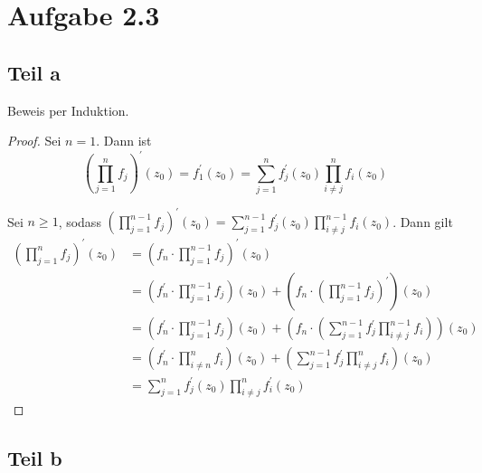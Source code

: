\documentclass[10pt,a4paper]{article}
\begin{document}
\section{Aufgabe 2.3}

\subsection{Teil a}

Beweis per Induktion.

\begin{proof}
  Sei $n = 1$. Dann ist
  \begin{equation*}
    \left( \prod_{j = 1}^{n} f_{j} \right)^{'}(z_{0}) = f_{1}^{'}(z_{0}) = \sum_{j = 1}^{n} f_{j}^{'}(z_{0}) \prod_{i \ne j}^{n} f_{i}(z_{0})
  \end{equation*}

  Sei $n \ge 1$, sodass
  $\left( \prod_{j = 1}^{n - 1} f_{j} \right)^{'}(z_{0}) = \sum_{j = 1}^{n - 1}
  f_{j}^{'}(z_{0}) \prod_{i \ne j}^{n - 1} f_{i}(z_{0})$. Dann gilt
  \begin{align*}
    \left( \prod_{j = 1}^{n} f_{j} \right)^{'}(z_{0}) & = \left( f_{n} \cdot \prod_{j = 1}^{n - 1} f_{j} \right)^{'}(z_{0})\\
                                                      & = \left( f_{n}^{'} \cdot \prod_{j = 1}^{n - 1} f_{j} \right)(z_{0}) + \left( f_{n} \cdot \left( \prod_{j = 1}^{n - 1} f_{j} \right)^{'} \right)(z_{0})\\
                                                      & = \left( f_{n}^{'} \cdot \prod_{j = 1}^{n - 1} f_{j} \right)(z_{0}) + \left( f_{n} \cdot \left( \sum_{j = 1}^{n - 1} f_{j}^{'} \prod_{i \ne j}^{n - 1} f_{i} \right) \right)(z_{0})\\
                                                      & = \left( f_{n}^{'} \cdot \prod_{i \ne n}^{n} f_{i} \right)(z_{0}) +  \left( \sum_{j = 1}^{n - 1} f_{j}^{'} \prod_{i \ne j}^{n} f_{i} \right) (z_{0})\\
                                                      & = \sum_{j = 1}^{n} f_{j}^{'}(z_{0}) \prod_{i \ne j}^{n} f_{i}^{'}(z_{0})
  \end{align*}
\end{proof}

\subsection{Teil b}
\end{document}
